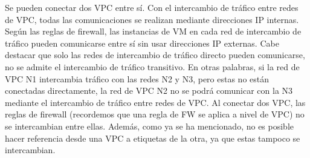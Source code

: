     Se pueden conectar dos VPC entre sí. Con el intercambio de tráfico entre redes de VPC, todas las comunicaciones se realizan mediante direcciones IP internas. Según las reglas de firewall, las instancias de VM en cada red de intercambio de tráfico pueden comunicarse entre sí sin usar direcciones IP externas. Cabe destacar que solo las redes de intercambio de tráfico directo pueden comunicarse, no se admite el intercambio de tráfico transitivo. En otras palabras, si la red de VPC N1 intercambia tráfico con las redes N2 y N3, pero estas no están conectadas directamente, la red de VPC N2 no se podrá comunicar con la N3 mediante el intercambio de tráfico entre redes de VPC. Al conectar dos VPC, las reglas de firewall (recordemos que una regla de FW se aplica a nivel de VPC) no se intercambian entre ellas. Además, como ya se ha mencionado, no es posible hacer referencia desde una VPC a etiquetas de la otra, ya que estas tampoco se intercambian.

